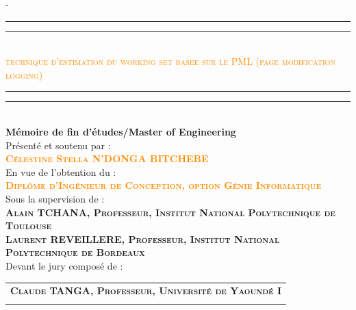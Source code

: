 \begin{titlingpage}
\begin{SingleSpace}
\begin{adjustwidth*}{\unitlength}{-\unitlength}
\vspace{0.3cm}
\begin{center}
\textcolor{darkorange}{\rule[0.5ex]{\linewidth}{2pt}\vspace*{-\baselineskip}\vspace*{2.9pt}}
\textcolor{darkorange}{\rule[0.5ex]{\linewidth}{1pt}}\\[\baselineskip]
{\Large {\textcolor{darkorange}{\textsc{ technique d'estimation du working set basee sur le PML (page modification logging) }}
} }\\[2mm]
\textcolor{darkorange}{\rule[0.5ex]{\linewidth}{1pt}\vspace*{-\baselineskip}\vspace{3.2pt}}
\textcolor{darkorange}{\rule[0.5ex]{\linewidth}{2pt}}\\[3mm]
{\Large \textbf{Mémoire de fin d’études/Master of Engineering}}\\
\vspace{4mm}
{Présenté et soutenu par :} \\
\vspace{4mm}
{\large \textsc{\textbf{\textcolor{darkorange}{Célestine Stella N'DONGA BITCHEBE}}}}\\
\vspace{6mm}
{En vue de l'obtention du :} \\
\vspace{4mm}
{\large \textsc{\textbf{\textcolor{darkorange}{Diplôme d’Ingénieur de Conception, option Génie Informatique}}}}\\
\vspace{4mm}
{Sous la supervision de :}\\
\vspace{4mm}
{\normalsize \textsc{\textbf{Alain TCHANA, Professeur, Institut National Polytechnique de Toulouse}}}\\
\vspace{4mm}
{\normalsize \textsc{\textbf{Laurent REVEILLERE, Professeur, Institut National Polytechnique de Bordeaux}}}\\
\vspace{4mm}
{Devant le jury composé de :} \\
\vspace{4mm}
\begin{tabular}{>{\centering\arraybackslash}p{16cm}}
{\Large Président :} \textbf{{\large \textsc{Claude TANGA, Professeur, Université de Yaoundé I}}} \\ \\


\end{tabular}
\end{center}
\end{adjustwidth*}
\end{SingleSpace}
\end{titlingpage}
